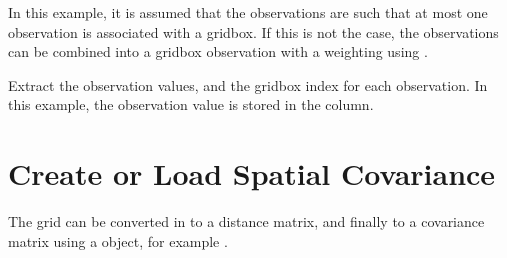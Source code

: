 \documentclass[letterpaper,10pt,english]{sphinxmanual}
\begin{document}
\begin{sphinxVerbatim}[commandchars=\\\{\}]
  
\end{sphinxVerbatim}

\sphinxAtStartPar
In this example, it is assumed that the observations are such that at most one observation is
associated with a grid\sphinxhyphen{}box. If this is not the case, the observations can be combined into a
grid\sphinxhyphen{}box \sphinxhyphen{}observation with a weighting using
{\hyperref[\detokenize{kriging:glomar_gridding.kriging.prep_obs_for_kriging}]{}}.

\sphinxAtStartPar
Extract the observation values, and the grid\sphinxhyphen{}box index for each observation. In this example, the
observation value is stored in the  column.

\begin{sphinxVerbatim}[commandchars=\\\{\}]
  \PYG{p}{[}\PYG{p}{]}
  \PYG{p}{[}\PYG{p}{]}
\end{sphinxVerbatim}


\section{Create or Load Spatial Covariance}
\label{\detokenize{workflow:create-or-load-spatial-covariance}}
\sphinxAtStartPar
The grid can be converted in to a distance matrix, and finally to a covariance matrix using a
 object, for example
{\hyperref[\detokenize{covariance:glomar_gridding.variogram.GaussianVariogram}]{}}.
\end{document}
